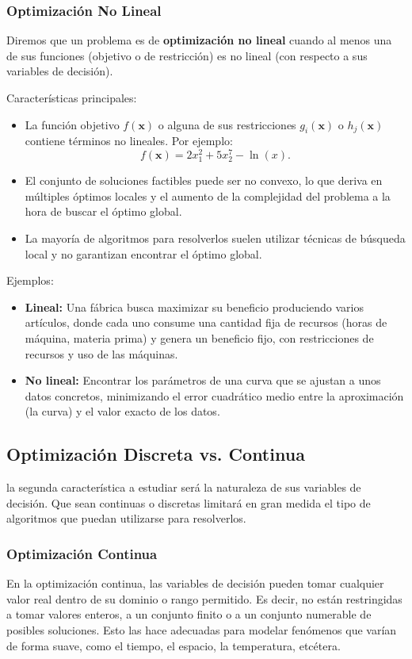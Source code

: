\documentclass[12pt,a4paper]{book}
\begin{document}
\subsubsection{Optimización No Lineal}
Diremos que un problema es de \textbf{optimización no lineal} cuando al menos una de sus funciones (objetivo o de restricción) es no lineal (con respecto a sus variables de decisión). 

Características principales:
\begin{itemize}
    \item La función objetivo $f(\mathbf{x})$ o alguna de sus restricciones $g_i(\mathbf{x})$ o $h_j(\mathbf{x})$ contiene términos no lineales. Por ejemplo:
    $$f(\mathbf{x})=2x_1^2+5x_2^7-\ln(x).$$
    \item El conjunto de soluciones factibles puede ser no convexo, lo que deriva en múltiples óptimos locales y el aumento de la complejidad del problema a la hora de buscar el óptimo global.
    \item La mayoría de algoritmos para resolverlos suelen utilizar técnicas de búsqueda local y no garantizan encontrar el óptimo global.
\end{itemize}

Ejemplos:
\begin{itemize}
    \item \textbf{Lineal:} Una fábrica busca maximizar su beneficio produciendo varios artículos, donde cada uno consume una cantidad fija de recursos (horas de máquina, materia prima) y genera un beneficio fijo, con restricciones de recursos y uso de las máquinas.
    \item \textbf{No lineal:} Encontrar los parámetros de una curva que se ajustan a unos datos concretos, minimizando el error cuadrático medio entre la aproximación (la curva) y el valor exacto de los datos.
\end{itemize}


\subsection{Optimización Discreta vs. Continua}
la segunda característica a estudiar será la naturaleza de sus variables de decisión. Que sean continuas o discretas
limitará en gran medida el tipo de algoritmos que puedan utilizarse para resolverlos.

\subsubsection{Optimización Continua}
En la optimización continua, las variables de decisión pueden tomar cualquier valor real dentro de su dominio o rango permitido. Es decir, no están restringidas a tomar valores enteros, a un conjunto finito o a un conjunto numerable de posibles soluciones. Esto las hace adecuadas para modelar fenómenos que varían de forma suave, como el tiempo, el espacio, la temperatura, etcétera.
\end{document}
